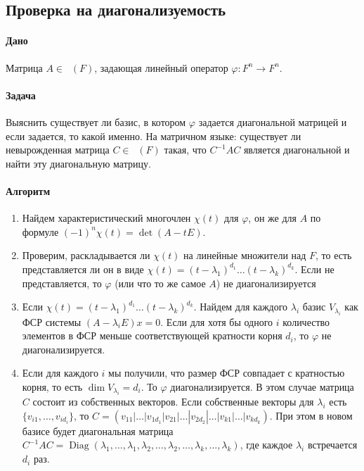 \documentclass{article}
\newcommand{\Matrix}[2]{\mathop{\mathrm{M}_{#2}}(#1)}
\begin{document}
\subsection{Проверка на диагонализуемость}

\paragraph{Дано} Матрица $A\in\Matrix{F}{n}$, задающая линейный оператор $\varphi\colon F^n\to F^n$.

\paragraph{Задача} Выяснить существует ли базис, в котором $\varphi$ задается диагональной матрицей и если задается, то какой именно. На матричном языке: существует ли невырожденная матрица $C\in \Matrix{F}{n}$ такая, что $C^{-1}AC$ является диагональной и найти эту диагональную матрицу.

\paragraph{Алгоритм}

\begin{enumerate}
\item Найдем характеристический многочлен $\chi(t)$ для $\varphi$, он же для $A$ по формуле $(-1)^n\chi(t) = \det(A-t E)$.

\item Проверим, раскладывается ли $\chi(t)$ на линейные множители над $F$, то есть представляется ли он в виде $\chi(t) = (t-\lambda_1)^{d_1} \ldots (t-\lambda_k)^{d_k}$. Если не представляется, то $\varphi$ (или что то же самое $A$) не диагонализируется


\item Если $\chi(t) = (t-\lambda_1)^{d_1} \ldots (t-\lambda_k)^{d_k}$. Найдем для каждого $\lambda_i$ базис $V_{\lambda_i}$ как ФСР системы $(A-\lambda_i E)x = 0$. Если для хотя бы одного $i$ количество элементов в ФСР меньше соответствующей кратности корня $d_i$, то $\varphi$ не диагонализируется.

\item Если для каждого $i$ мы получили, что размер ФСР совпадает с кратностью корня, то есть $\dim V_{\lambda_i} = d_i$. То $\varphi$ диагонализируется. В этом случае матрица $C$ состоит из собственных векторов. Если собственные векторы для $\lambda_i$ есть $\{v_{i1},\ldots,v_{id_i}\}$, то $C = (v_{11}|\ldots|v_{1d_1}|v_{21}|\ldots|v_{2d_2}|\ldots |v_{k1}|\ldots|v_{kd_k})$. При этом в новом базисе будет диагональная матрица $C^{-1}AC =\operatorname{Diag}(\lambda_1,\ldots,\lambda_1,\lambda_2,\ldots,\lambda_2,\ldots,\lambda_k,\ldots,\lambda_k)$, где каждое $\lambda_i$ встречается $d_i$ раз.
\end{enumerate}
\end{document}

